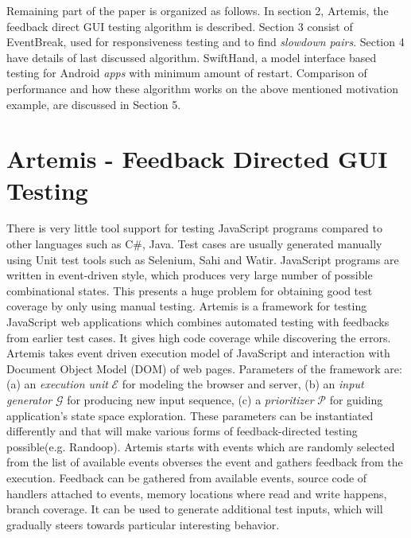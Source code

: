 \documentclass[authoryear,preprint, twocolumn]{sigplanconf}
\begin{document}
\newline Remaining part of the paper is organized as follows. In section 2, Artemis, the feedback direct GUI testing algorithm is described. Section 3 consist of EventBreak, used for responsiveness testing and to find \emph{slowdown pairs}. Section 4 have details of last discussed algorithm. SwiftHand, a model interface based testing for Android \emph{apps} with minimum amount of restart. Comparison of performance and how these algorithm works on the above mentioned motivation example, are discussed in Section 5. 


\section{Artemis - Feedback Directed GUI Testing}
\label{sec:artemis}
There is very little tool support for testing JavaScript programs compared to other languages such as C\#, Java. Test cases are usually generated manually using Unit test tools such as Selenium, Sahi and Watir. JavaScript programs are written in event-driven style, which produces very large number of possible combinational states. This presents a huge problem for obtaining good test coverage by only using manual testing.
\newline Artemis is a framework for testing JavaScript web applications which combines automated testing with feedbacks from earlier test cases. It gives high code coverage while discovering the errors.
\newline Artemis takes event driven execution model of JavaScript and interaction with Document Object Model (DOM) of web pages. Parameters of the framework are: (a) an \emph{execution unit} $\mathcal{E}$ for modeling the browser and server, (b) an \emph{input generator} $\mathcal{G}$ for producing new input sequence, (c) a \emph{prioritizer} $\mathcal{P}$ for guiding application's state space exploration. These parameters can be instantiated differently and that will make various forms of feedback-directed testing possible(e.g. Randoop).
\newline Artemis starts with events which are randomly selected from the list of available events obverses the event and gathers feedback from the execution. Feedback can be gathered from available events, source code of handlers attached to events, memory locations where read and write happens, branch coverage. It can be used to generate additional test inputs, which will gradually steers towards particular interesting behavior.
\end{document}
